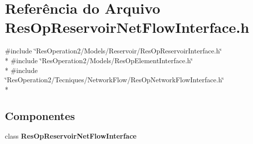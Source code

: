 \section{Referência do Arquivo Res\+Op\+Reservoir\+Net\+Flow\+Interface.\+h}
\label{_res_op_reservoir_net_flow_interface_8h}
{\ttfamily \#include \char`\"{}Res\+Operation2/\+Models/\+Reservoir/\+Res\+Op\+Reservoir\+Interface.\+h\char`\"{}}\\*
{\ttfamily \#include \char`\"{}Res\+Operation2/\+Models/\+Res\+Op\+Element\+Interface.\+h\char`\"{}}\\*
{\ttfamily \#include \char`\"{}Res\+Operation2/\+Tecniques/\+Network\+Flow/\+Res\+Op\+Network\+Flow\+Interface.\+h\char`\"{}}\\*
\subsection*{Componentes}
\begin{DoxyCompactItemize}
\item 
class {\bf Res\+Op\+Reservoir\+Net\+Flow\+Interface}
\end{DoxyCompactItemize}
